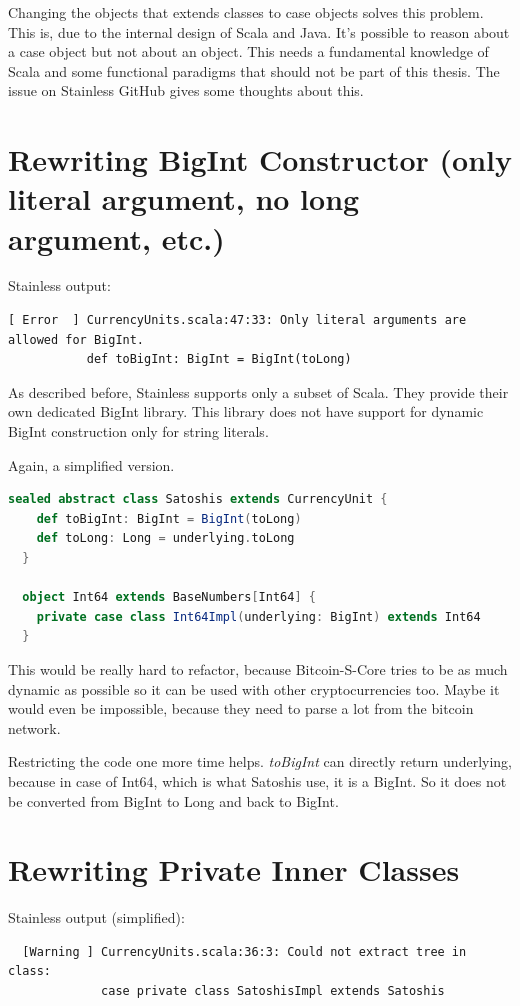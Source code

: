 Changing the objects that extends classes to case objects solves this problem.
This is, due to the internal design of Scala and Java.
It's possible to reason about a case object but not about an object.
This needs a fundamental knowledge of Scala and some functional paradigms that should not be part of this thesis.
The issue  on Stainless GitHub gives some thoughts about this.


\section{Rewriting BigInt Constructor (only literal argument, no long argument, etc.)}
Stainless output:
\begin{lstlisting}
[ Error  ] CurrencyUnits.scala:47:33: Only literal arguments are allowed for BigInt.
           def toBigInt: BigInt = BigInt(toLong)
\end{lstlisting}

As described before, Stainless supports only a subset of Scala.
They provide their own dedicated BigInt library.
This library does not have support for dynamic BigInt construction only for string literals.

Again, a simplified version.
\begin{lstlisting}[language=scala]
  sealed abstract class Satoshis extends CurrencyUnit {
    def toBigInt: BigInt = BigInt(toLong)
    def toLong: Long = underlying.toLong
  }

  object Int64 extends BaseNumbers[Int64] {
    private case class Int64Impl(underlying: BigInt) extends Int64
  }
\end{lstlisting}

This would be really hard to refactor, because Bitcoin-S-Core tries to be as much dynamic as possible so it can be used with other cryptocurrencies too.
Maybe it would even be impossible, because they need to parse a lot from the bitcoin network.

Restricting the code one more time helps.
\emph{toBigInt} can directly return underlying, because in case of Int64, which is what Satoshis use, it is a BigInt.
So it does not be converted from BigInt to Long and back to BigInt.


\section{Rewriting Private Inner Classes}
Stainless output (simplified):
\begin{lstlisting}
  [Warning ] CurrencyUnits.scala:36:3: Could not extract tree in class:
             case private class SatoshisImpl extends Satoshis
\end{lstlisting}

